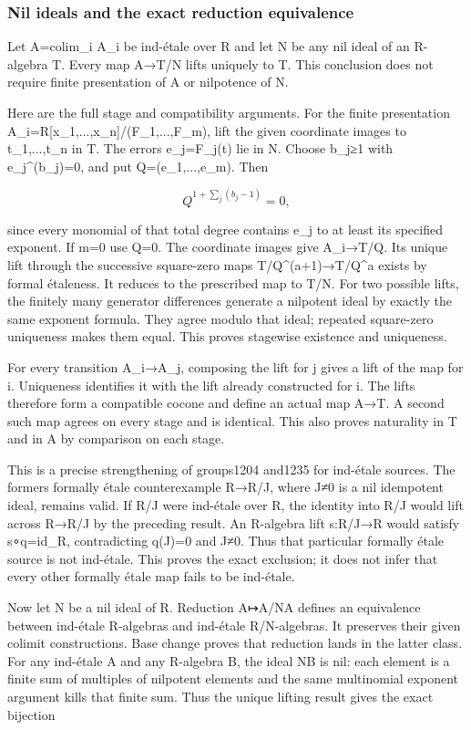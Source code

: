 \subsubsection{Nil ideals and the exact reduction equivalence}\label{algebra-proof-059-nil-ideals-and-the-exact-reduction-equivalence}

Let A=colim\_i A\_i be ind-étale over R and let N be any nil ideal of an R-algebra T. Every map A→T/N lifts uniquely to T. This conclusion does not require finite presentation of A or nilpotence of N.

Here are the full stage and compatibility arguments. For the finite presentation A\_i=R{[}x\_1,...,x\_n{]}/(F\_1,...,F\_m), lift the given coordinate images to t\_1,...,t\_n in T. The errors e\_j=F\_j(t) lie in N. Choose b\_j≥1 with e\_j\^{}(b\_j)=0, and put Q=(e\_1,...,e\_m). Then

\[
Q^{1+\sum_j(b_j-1)}=0,
\]

since every monomial of that total degree contains e\_j to at least its specified exponent. If m=0 use Q=0. The coordinate images give A\_i→T/Q. Its unique lift through the successive square-zero maps T/Q\^{}(a+1)→T/Q\^{}a exists by formal étaleness. It reduces to the prescribed map to T/N. For two possible lifts, the finitely many generator differences generate a nilpotent ideal by exactly the same exponent formula. They agree modulo that ideal; repeated square-zero uniqueness makes them equal. This proves stagewise existence and uniqueness.

For every transition A\_i→A\_j, composing the lift for j gives a lift of the map for i. Uniqueness identifies it with the lift already constructed for i. The lifts therefore form a compatible cocone and define an actual map A→T. A second such map agrees on every stage and is identical. This also proves naturality in T and in A by comparison on each stage.

This is a precise strengthening of groups1204 and1235 for ind-étale sources. The former\textquotesingle s formally étale counterexample R→R/J, where J≠0 is a nil idempotent ideal, remains valid. If R/J were ind-étale over R, the identity into R/J would lift across R→R/J by the preceding result. An R-algebra lift s:R/J→R would satisfy s∘q=id\_R, contradicting q(J)=0 and J≠0. Thus that particular formally étale source is not ind-étale. This proves the exact exclusion; it does not infer that every other formally étale map fails to be ind-étale.

Now let N be a nil ideal of R. Reduction A↦A/NA defines an equivalence between ind-étale R-algebras and ind-étale R/N-algebras. It preserves their given colimit constructions. Base change proves that reduction lands in the latter class. For any ind-étale A and any R-algebra B, the ideal NB is nil: each element is a finite sum of multiples of nilpotent elements and the same multinomial exponent argument kills that finite sum. Thus the unique lifting result gives the exact bijection

